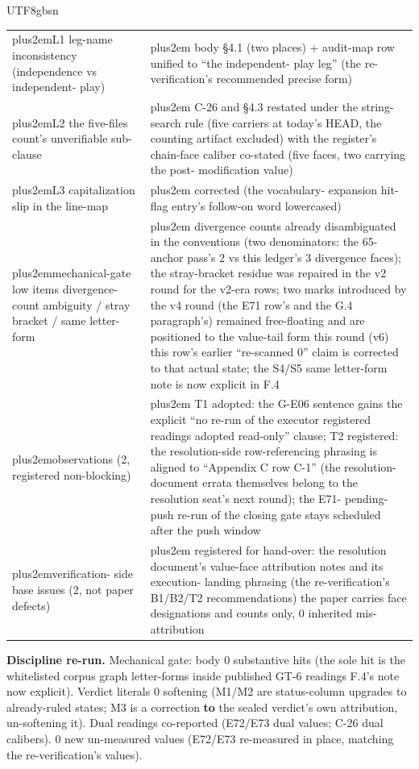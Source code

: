 \documentclass[11pt,letterpaper]{article}
\newcommand{\RaggedRight}{\rightskip=0pt plus2em\relax}
\begin{document}
\begin{CJK}{UTF8}{gbsn}
{\begin{longtable}{>{\RaggedRight\arraybackslash}p{6.85cm} >{\RaggedRight\arraybackslash}p{6.85cm}}
L1 \textemdash{} leg-name inconsistency (independence vs independent-\penalty-100 play) & body \S{}4.1 (two places) + audit-map row unified to ``the independent-\penalty-100 play leg'' (the re-verification's recommended precise form) \\
L2 \textemdash{} the five-files count's unverifiable sub-clause & C-26 and \S{}4.3 restated under the string-search rule (five carriers at today's HEAD, the counting artifact excluded) with the register's chain-face caliber co-stated (five faces, two carrying the post-\penalty-100 modification value) \\
L3 \textemdash{} capitalization slip in the line-map & corrected (the vocabulary-\penalty-100 expansion hit-flag entry's follow-on word lowercased) \\
mechanical-gate low items \textemdash{} divergence-\penalty-100 count ambiguity / stray bracket / same letter-form & divergence counts already disambiguated in the conventions (two denominators: the 65-anchor pass's 2 vs this ledger's 3 divergence faces); the stray-bracket residue was repaired in the v2 round for the v2-era rows; two marks introduced by the v4 round (the E71 row's and the G.4 paragraph's) remained free-floating and are positioned to the value-tail form this round (v6) \textemdash{} this row's earlier ``re-scanned 0'' claim is corrected to that actual state; the S4/S5 same letter-form note is now explicit in F.4 \\
observations (2, registered non-blocking) & T1 adopted: the G-E06 sentence gains the explicit ``no re-run of the executor \textemdash{} registered readings adopted read-only'' clause; T2 registered: the resolution-side row-referencing phrasing is aligned to ``Appendix C row C-1'' (the resolution-\penalty-100 document errata themselves belong to the resolution seat's next round); the E71-\penalty-100 pending-\penalty-100 push re-run of the closing gate stays scheduled after the push window \\
verification-\penalty-100 side base issues (2, not paper defects) & registered for hand-over: the resolution document's value-face attribution notes and its execution-\penalty-100 landing phrasing (the re-verification's B1/B2/T2 recommendations) \textemdash{} the paper carries face designations and counts only, 0 inherited mis-attribution \\
\end{longtable}}

\textbf{Discipline re-run.} Mechanical gate: body 0 substantive hits (the sole hit is the whitelisted corpus graph letter-forms inside published GT-6 readings \textemdash{} F.4's note now explicit). Verdict literals 0 softening (M1/M2 are status-column upgrades to already-ruled states; M3 is a correction \textbf{to} the sealed verdict's own attribution, un-softening it). Dual readings co-reported (E72/E73 dual values; C-26 dual calibers). 0 new un-measured values (E72/E73 re-measured in place, matching the re-verification's values).


\end{CJK}
\end{document}

